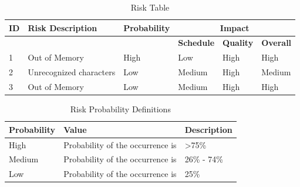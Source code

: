 \documentclass[oneside,a4paper,12pt]{pictreport}
\begin{document}
\renewcommand{\arraystretch}{1.5}
\begin{table}[h!]
\caption{Risk Table}
\begin{tabular}{|l|l|l|l|l|l|}
\hline
\textbf{ID} & \textbf{Risk Description} & \textbf{Probability} & \multicolumn{3}{c|}{\textbf{Impact}}                                         \\ \hline
            & \textbf{}                 & \textbf{}            & \textbf{Schedule} & \textbf{Quality} & \textbf{Overall} \\ \hline
1           & Out of Memory             & High                & Low                      & High                    & High                    \\ \hline
2           & Unrecognized characters            & Low               & Medium                   & High                    & Medium                  \\ \hline
3           & Out of Memory         & Low               & Medium                   & High                    & High                    \\ \hline
\end{tabular}
\end{table}

\begin{table}[h!]
\centering
\caption{Risk Probability Definitions}
\begin{tabular}{|l|l|l|}
\hline
\textbf{Probability} & \textbf{Value}                   & \textbf{Description} \\ \hline
High                 & Probability of the occurrence is & \textgreater 75\%    \\ \hline
Medium               & Probability of the occurrence is & 26\% - 74\%          \\ \hline
Low                  & Probability of the occurrence is & 25\%                 \\ \hline
\end{tabular}
\end{table}
\end{document}
